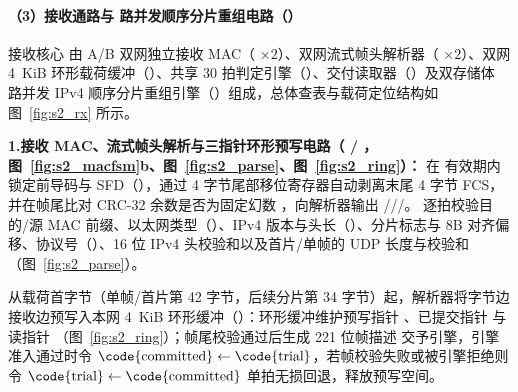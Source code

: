 
\paragraph{（3）接收通路与 \ReasmContexts{} 路并发顺序分片重组电路（）}

接收核心  由 A/B 双网独立接收 MAC（ $\times 2$）、双网流式帧头解析器（ $\times 2$）、双网 4~KiB 环形载荷缓冲（）、共享 30 拍判定引擎（）、交付读取器（）及双存储体 \ReasmContexts{} 路并发 IPv4 顺序分片重组引擎（）组成，总体查表与载荷定位结构如图~\ref{fig:s2_rx} 所示。

\noindent \textbf{1.\quad 接收 MAC、流式帧头解析与三指针环形预写电路（ / ，图~\ref{fig:s2_macfsm}b、图~\ref{fig:s2_parse}、图~\ref{fig:s2_ring}）：}
 在  有效期内锁定前导码与 SFD（），通过 4 字节尾部移位寄存器自动剥离末尾 4 字节 FCS，并在帧尾比对 CRC-32 余数是否为固定幻数 ，向解析器输出 ///。 逐拍校验目的/源 MAC 前缀、以太网类型（）、IPv4 版本与头长（）、分片标志与 8B 对齐偏移、协议号（）、16 位 IPv4 头校验和以及首片/单帧的 UDP 长度与校验和（图~\ref{fig:s2_parse}）。


从载荷首字节（单帧/首片第 42 字节，后续分片第 34 字节）起，解析器将字节边接收边预写入本网 4~KiB 环形缓冲（）：环形缓冲维护预写指针 、已提交指针  与读指针 （图~\ref{fig:s2_ring}）；帧尾校验通过后生成 221 位帧描述  交予引擎，引擎准入通过时令 $\text{\code{committed}}\leftarrow\text{\code{trial}}$，若帧校验失败或被引擎拒绝则令 $\text{\code{trial}}\leftarrow\text{\code{committed}}$ 单拍无损回退，释放预写空间。


